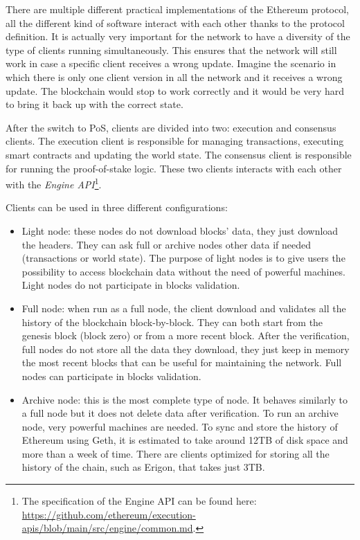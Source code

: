 There are multiple different practical implementations of the Ethereum protocol, all the different kind of software interact with each other thanks to the protocol definition. It is actually very important for the network to have a diversity of the type of clients running simultaneously. This ensures that the network will still work in case a specific client receives a wrong update. Imagine the scenario in which there is only one client version in all the network and it receives a wrong update. The blockchain would stop to work correctly and it would be very hard to bring it back up with the correct state.

After the switch to PoS, clients are divided into two: execution and consensus clients. The execution client is responsible for managing transactions, executing smart contracts and updating the world state. The consensus client is responsible for running the proof-of-stake logic. These two clients interacts with each other with the \textit{Engine API}\footnote{The specification of the Engine API can be found here: \url{https://github.com/ethereum/execution-apis/blob/main/src/engine/common.md}.}.

Clients can be used in three different configurations:

\begin{itemize}
    \item Light node: these nodes do not download blocks' data, they just download the headers. They can ask full or archive nodes other data if needed (transactions or world state). The purpose of light nodes is to give users the possibility to access blockchain data without the need of powerful machines. Light nodes do not participate in blocks validation.
    \item Full node: when run as a full node, the client download and validates all the history of the blockchain block-by-block. They can both start from the genesis block (block zero) or from a more recent block. After the verification, full nodes do not store all the data they download, they just keep in memory the most recent blocks that can be useful for maintaining the network. Full nodes can participate in blocks validation.
    \item Archive node: this is the most complete type of node. It behaves similarly to a full node but it does not delete data after verification. To run an archive node, very powerful machines are needed. To sync and store the history of Ethereum using Geth, it is estimated to take around 12TB of disk space and more than a week of time. There are clients optimized for storing all the history of the chain, such as Erigon, that takes just 3TB. 
\end{itemize}

